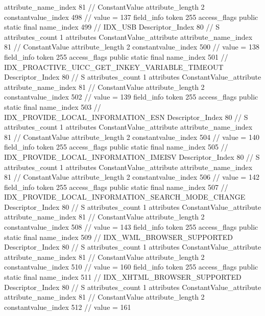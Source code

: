 {{{{{{{					attribute_name_index	81		// ConstantValue
					attribute_length	2
					constantvalue_index	498		// value = 137
				}
				}
			}
			field_info {
				token	255
				access_flags	public static final
				name_index	499		// IDX_USB
				Descriptor_Index	80		// S
				attributes_count	1
				attributes {
				ConstantValue_attribute {
					attribute_name_index	81		// ConstantValue
					attribute_length	2
					constantvalue_index	500		// value = 138
				}
				}
			}
			field_info {
				token	255
				access_flags	public static final
				name_index	501		// IDX_PROACTIVE_UICC_GET_INKEY_VARIABLE_TIMEOUT
				Descriptor_Index	80		// S
				attributes_count	1
				attributes {
				ConstantValue_attribute {
					attribute_name_index	81		// ConstantValue
					attribute_length	2
					constantvalue_index	502		// value = 139
				}
				}
			}
			field_info {
				token	255
				access_flags	public static final
				name_index	503		// IDX_PROVIDE_LOCAL_INFORMATION_ESN
				Descriptor_Index	80		// S
				attributes_count	1
				attributes {
				ConstantValue_attribute {
					attribute_name_index	81		// ConstantValue
					attribute_length	2
					constantvalue_index	504		// value = 140
				}
				}
			}
			field_info {
				token	255
				access_flags	public static final
				name_index	505		// IDX_PROVIDE_LOCAL_INFORMATION_IMEISV
				Descriptor_Index	80		// S
				attributes_count	1
				attributes {
				ConstantValue_attribute {
					attribute_name_index	81		// ConstantValue
					attribute_length	2
					constantvalue_index	506		// value = 142
				}
				}
			}
			field_info {
				token	255
				access_flags	public static final
				name_index	507		// IDX_PROVIDE_LOCAL_INFORMATION_SEARCH_MODE_CHANGE
				Descriptor_Index	80		// S
				attributes_count	1
				attributes {
				ConstantValue_attribute {
					attribute_name_index	81		// ConstantValue
					attribute_length	2
					constantvalue_index	508		// value = 143
				}
				}
			}
			field_info {
				token	255
				access_flags	public static final
				name_index	509		// IDX_WML_BROWSER_SUPPORTED
				Descriptor_Index	80		// S
				attributes_count	1
				attributes {
				ConstantValue_attribute {
					attribute_name_index	81		// ConstantValue
					attribute_length	2
					constantvalue_index	510		// value = 160
				}
				}
			}
			field_info {
				token	255
				access_flags	public static final
				name_index	511		// IDX_XHTML_BROWSER_SUPPORTED
				Descriptor_Index	80		// S
				attributes_count	1
				attributes {
				ConstantValue_attribute {
					attribute_name_index	81		// ConstantValue
					attribute_length	2
					constantvalue_index	512		// value = 161
}}}}}}}
